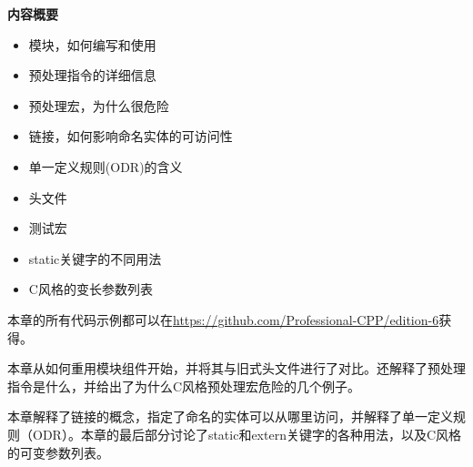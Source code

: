\noindent
\textbf{内容概要}

\begin{itemize}
\item
模块，如何编写和使用

\item
预处理指令的详细信息

\item
预处理宏，为什么很危险

\item
链接，如何影响命名实体的可访问性

\item
单一定义规则(ODR)的含义

\item
头文件

\item
测试宏

\item
static关键字的不同用法

\item
C风格的变长参数列表
\end{itemize}

本章的所有代码示例都可以在\url{https://github.com/Professional-CPP/edition-6}获得。

本章从如何重用模块组件开始，并将其与旧式头文件进行了对比。还解释了预处理指令是什么，并给出了为什么C风格预处理宏危险的几个例子。

本章解释了链接的概念，指定了命名的实体可以从哪里访问，并解释了单一定义规则（ODR）。本章的最后部分讨论了static和extern关键字的各种用法，以及C风格的可变参数列表。































